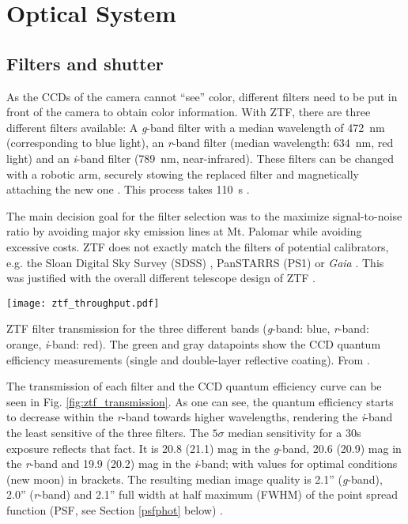 \section{Optical System}

\subsection{Filters and shutter}
As the CCDs of the camera cannot ``see'' color, different filters need to be put in front of the camera to obtain color information. With ZTF, there are three different filters available: A \textit{g}-band filter with a median wavelength of \SI{472}{\nano \meter} (corresponding to blue light), an \textit{r}-band filter (median wavelength: \SI{634}{\nano \meter}, red light) and an \textit{i}-band filter (\SI{789}{\nano \meter}, near-infrared). These filters can be changed with a robotic arm, securely stowing the replaced filter and magnetically attaching the new one \cite{Dekany2020}. This process takes \SI{110}{\second} \cite{Bellm2019}. 

The main decision goal for the filter selection was to the maximize signal-to-noise ratio by avoiding major sky emission lines at Mt. Palomar while avoiding excessive costs. ZTF does not exactly match the filters of potential calibrators, e.g. the Sloan Digital Sky Survey (SDSS) , PanSTARRS (PS1)  or \textit{Gaia} . This was justified with the overall different telescope design of ZTF \cite{Bellm2019}.

\begin{marginfigure}
    \texttt{[image: ztf\_throughput.pdf]}
    \caption[ZTF filter transmission]{ZTF filter transmission for the three different bands (\textit{g}-band: blue, \textit{r}-band: orange, \textit{i}-band: red). The green and gray datapoints show the CCD quantum efficiency measurements (single and double-layer reflective coating). From \cite{Bellm2019}.}
\end{marginfigure}

The transmission of each filter and the CCD quantum efficiency curve can be seen in Fig. \ref{fig:ztf_transmission}. As one can see, the quantum efficiency starts to decrease within the \textit{r}-band towards higher wavelengths, rendering the \textit{i}-band the least sensitive of the three filters. The $5\sigma$ median sensitivity for a 30s exposure reflects that fact. It is 20.8 (21.1) mag in the \textit{g}-band, 20.6 (20.9) mag in the \textit{r}-band and 19.9 (20.2) mag in the \textit{i}-band; with values for optimal conditions (new moon) in brackets. The resulting median image quality is 2.1'' (\textit{g}-band), 2.0'' (\textit{r}-band) and 2.1'' full width at half maximum (FWHM) of the point spread function (PSF, see Section \ref{psfphot} below) \cite{Bellm2019}.

